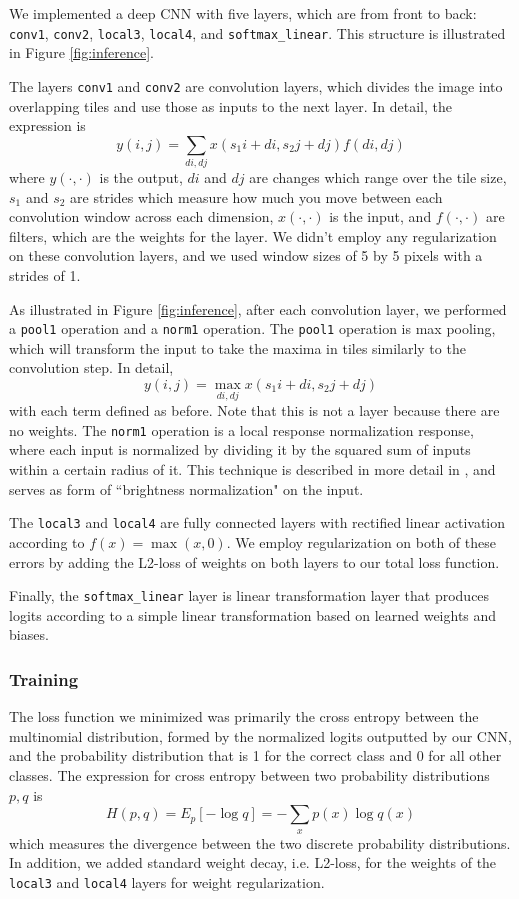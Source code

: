 \documentclass[11pt, twocolumn, twoside]{article}
\begin{document}
We implemented a deep CNN with five layers, which are from front to back: \texttt{conv1}, \texttt{conv2}, \texttt{local3}, \texttt{local4}, and \texttt{softmax\_linear}. This structure is illustrated in Figure \ref{fig:inference}. 

The layers \texttt{conv1} and \texttt{conv2} are convolution layers, which divides the image into overlapping tiles and use those as inputs to the next layer. In detail, the expression is
\[ y(i, j) = \sum_{di, dj} x(s_1i + di, s_2j + dj) f(di, dj)\]
where $y(\cdot, \cdot)$ is the output, $di$ and $dj$ are changes which range over the tile size, $s_1$ and $s_2$ are strides which measure how much you move between each convolution window across each dimension, $x(\cdot, \cdot)$ is the input, and $f(\cdot, \cdot)$ are filters, which are the weights for the layer. We didn't employ any regularization on these convolution layers, and we used window sizes of 5 by 5 pixels with a strides of 1.

As illustrated in Figure \ref{fig:inference}, after each convolution layer, we performed a \texttt{pool1} operation and a \texttt{norm1} operation. The \texttt{pool1} operation is max pooling, which will transform the input to take the maxima in tiles similarly to the convolution step. In detail,
\[ y(i, j) = \max_{di, dj} x(s_1i + di, s_2j + dj)\]
with each term defined as before. Note that this is not a layer because there are no weights. The \texttt{norm1} operation is a local response normalization response, where each input is normalized by dividing it by the squared sum of inputs within a certain radius of it. This technique is described in more detail in \cite{Krizhevsky}, and serves as form of ``brightness normalization" on the input.

The \texttt{local3} and \texttt{local4} are fully connected layers with rectified linear activation according to $f(x) = \max(x, 0)$. We employ regularization on both of these errors by adding the L2-loss of weights on both layers to our total loss function. 

Finally, the \texttt{softmax\_linear} layer is linear transformation layer that produces logits according to a simple linear transformation based on learned weights and biases.

\subsubsection{Training}

The loss function we minimized was primarily the cross entropy between the multinomial distribution, formed by the normalized logits outputted by our CNN, and the probability distribution that is 1 for the correct class and 0 for all other classes. The expression for cross entropy between two probability distributions $p, q$ is
\[H(p, q) = E_p[-\log q] = -\sum_x p(x)\log q(x)\]
which measures the divergence between the two discrete probability distributions. In addition, we added standard weight decay, i.e. L2-loss, for the weights of the \texttt{local3} and \texttt{local4} layers for weight regularization.
\end{document}
